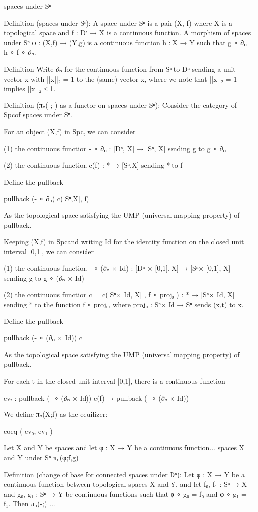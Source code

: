 \documentclass{book}
\theoremstyle{definition}
\begin{document}
 spaces under Sⁿ

Definition (spaces under Sⁿ): A space under Sⁿ is a pair (X, f) where X is a topological space and f : Dⁿ → X is a continuous function. A morphism of spaces under Sⁿ φ : (X,f) → (Y,g) is a continuous function h : X → Y such that g  ∘ ∂ₙ  = h ∘ f ∘ ∂ₙ.

Definition Write ∂ₙ for the continuous function from Sⁿ to Dⁿ sending a unit vector x with ||x||₂ = 1 to the (same) vector x, where we note that ||x||₂ = 1 implies ||x||₂ ≤ 1.

Definition (πₙ(-;-) as a functor on spaces under Sⁿ): Consider the category of Spc of spaces under Sⁿ.

For an object (X,f) in Spc, we can consider 

(1) the continuous function - ∘ ∂ₙ : [Dⁿ, X] → [Sⁿ, X] sending g to g ∘ ∂ₙ

(2) the continuous function c(f) : {*} → [Sⁿ,X] sending * to f

Define the pullback 

pullback (- ∘ ∂ₙ) c([Sⁿ,X], f)

As the topological space satisfying the UMP (universal mapping property) of pullback.

Keeping (X,f) in Spc and writing Id for the identity function on the closed unit interval [0,1], we can consider

(1) the continuous function - ∘ (∂ₙ × Id) : [Dⁿ × [0,1], X] → [Sⁿ×  [0,1], X] sending g to g ∘ (∂ₙ × Id)

(2) the continuous function c = c([Sⁿ× Id, X] , f ∘ proj₀ ) : {*} → [Sⁿ× Id, X] sending * to the function f ∘ proj₀, where proj₀ : Sⁿ× Id → Sⁿ sends (x,t) to x.

Define the pullback 

pullback (- ∘ (∂ₙ × Id)) c

As the topological space satisfying the UMP (universal mapping property) of pullback.

For each t in the closed unit interval [0,1], there is a continuous function

evₜ : pullback (- ∘ (∂ₙ × Id)) c(f) → pullback (- ∘ (∂ₙ × Id)) 

We define πₙ(X;f) as the equilizer:

coeq ( ev₀, ev₁ )

Let X and Y be spaces and let φ : X  → Y be a continuous function... spaces X and Y under Sⁿ  πₙ(φ;f,g)


Definition (change of base for connected spaces under Dⁿ):  Let φ : X → Y be a continuous function between topological spaces X and Y, and let f₀, f₁ : Sⁿ → X and g₀, g₁ : Sⁿ → Y be continuous functions such that φ ∘ g₀ = f₀ and φ ∘ g₁ = f₁. Then πₙ(-;)  ...
\end{document}
